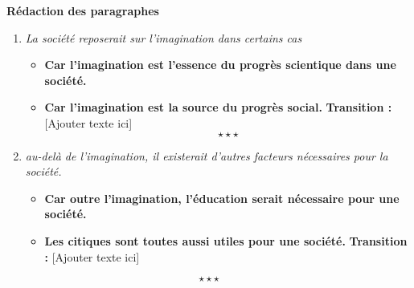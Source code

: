 %
%
%
\newpage

\begin{center}
	{\bfseries Rédaction des paragraphes}	
\end{center}

\begin{enumerate}[label*=$\longrightarrow$]
	\item \textit{La société reposerait sur l'imagination dans certains cas}
	\begin{itemize}
		\item \textbf{Car l'imagination est l'essence du progrès scientique dans une société.}
		\item \textbf{Car l'imagination est la source du  progrès social.} \newline 
		\textbf{Transition :} [Ajouter texte ici] $$\star \star \star$$
	\end{itemize}
	\item \textit{au-delà de l'imagination, il existerait d'autres facteurs nécessaires pour la société.}
	\begin{itemize}
		\item \textbf{Car outre l'imagination, l'éducation serait nécessaire pour une société.}
		\item \textbf{Les citiques sont toutes aussi utiles pour une société.} \newline 
		\textbf{Transition :} [Ajouter texte ici]
	\end{itemize}
\end{enumerate}
$$\star \star \star$$
%
